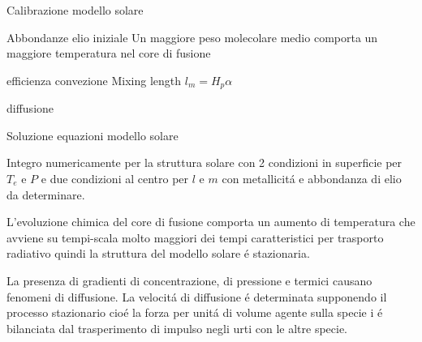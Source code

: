 \documentclass[10pt,xcolor={usenames},fleqn,mathserif,serif]{beamer}
\begin{document}
\begin{frame}{Calibrazione modello solare}

\begin{block}{Abbondanze elio iniziale}
Un maggiore peso molecolare medio comporta un maggiore temperatura nel core di fusione
\end{block}

\begin{block}{efficienza convezione}
Mixing length $l_m=H_p\alpha$
\end{block}

\begin{block}{diffusione}

\end{block}

\end{frame}

\begin{wordonframe}{Soluzione equazioni modello solare}

Integro numericamente per la struttura solare con 2 condizioni in superficie per $T_e$ e $P$ e due condizioni al centro per $l$ e $m$ con metallicit\'a e abbondanza di elio da determinare.

L'evoluzione chimica del core di fusione comporta un aumento di temperatura che avviene su tempi-scala molto maggiori dei tempi caratteristici per trasporto radiativo quindi la struttura del modello solare \'e stazionaria.

La presenza di gradienti di concentrazione, di pressione e termici causano fenomeni di diffusione. La velocit\'a di diffusione \'e determinata supponendo il processo stazionario cio\'e la forza per unit\'a di volume agente sulla specie i \'e bilanciata dal trasperimento di impulso negli urti con le altre specie.

\end{wordonframe}
\end{document}
